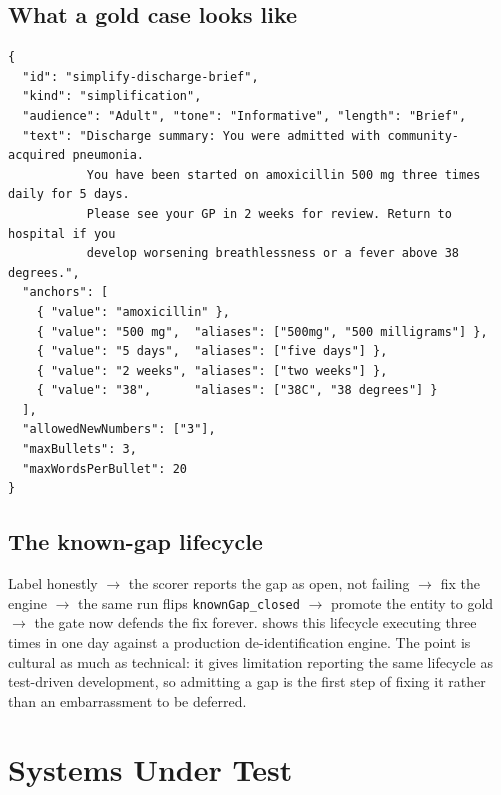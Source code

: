 \documentclass[11pt,a4paper]{article}
\begin{document}
\subsection{What a gold case looks like}

\begin{lstlisting}[style=json, caption={A simplification gold case. The anchors are the facts whose
loss would be a safety event; \texttt{allowedNewNumbers} whitelists numbers a faithful rewrite may
introduce (here, ``3 times a day'' for ``three times daily''); the contract encodes the product's
documented Brief-mode output shape.}, label={lst:case}]
{
  "id": "simplify-discharge-brief",
  "kind": "simplification",
  "audience": "Adult", "tone": "Informative", "length": "Brief",
  "text": "Discharge summary: You were admitted with community-acquired pneumonia.
           You have been started on amoxicillin 500 mg three times daily for 5 days.
           Please see your GP in 2 weeks for review. Return to hospital if you
           develop worsening breathlessness or a fever above 38 degrees.",
  "anchors": [
    { "value": "amoxicillin" },
    { "value": "500 mg",  "aliases": ["500mg", "500 milligrams"] },
    { "value": "5 days",  "aliases": ["five days"] },
    { "value": "2 weeks", "aliases": ["two weeks"] },
    { "value": "38",      "aliases": ["38C", "38 degrees"] }
  ],
  "allowedNewNumbers": ["3"],
  "maxBullets": 3,
  "maxWordsPerBullet": 20
}
\end{lstlisting}

\subsection{The known-gap lifecycle}
\label{sec:knowngap}

Label honestly $\rightarrow$ the scorer reports the gap as open, not failing $\rightarrow$ fix the
engine $\rightarrow$ the same run flips \texttt{knownGap\_closed} $\rightarrow$ promote the entity to
gold $\rightarrow$ the gate now defends the fix forever.  shows this lifecycle
executing three times in one day against a production de-identification engine. The point is
cultural as much as technical: it gives limitation reporting the same lifecycle as test-driven
development, so admitting a gap is the first step of fixing it rather than an embarrassment to be
deferred.

\section{Systems Under Test}
\end{document}
